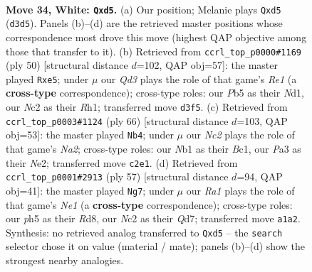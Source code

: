 \documentclass[11pt]{article}
\begin{document}
\clearpage

\begin{figure}[p]\centering
\begin{subfigure}{0.46\textwidth}\centering
\resizebox{\linewidth}{!}{%
\newchessgame
\chessboard[
  setfen={r2q1rk1/3n1pb1/3p4/1Ppb3p/p5nP/P2Q2P1/1PNB4/RN3RK1 w - - 2 34},
  showmover=false,
  pgfstyle=straightmove, color=movearrow, markmove={d3-d5}
]}
\caption{}
\end{subfigure}\hfill
\begin{subfigure}{0.46\textwidth}\centering
\resizebox{\linewidth}{!}{%
\newchessgame
\chessboard[
  setfen={r4r2/1bp2qbk/5np1/p3n2p/1p5P/3B2Q1/PPP2NP1/1K1NR2R w - - 0 26},
  showmover=false,
  pgfstyle=straightmove, color=movearrow, markmove={e1-e5}
]}
\caption{}
\end{subfigure}
\\[4pt]
\begin{subfigure}{0.46\textwidth}\centering
\resizebox{\linewidth}{!}{%
\newchessgame
\chessboard[
  setfen={rq4k1/1rn3b1/3p2p1/1pnPp1Pp/4P3/P4R1P/N1Q1N1K1/1RB5 w - - 9 34},
  showmover=false,
  pgfstyle=straightmove, color=movearrow, markmove={a2-b4}
]}
\caption{}
\end{subfigure}\hfill
\begin{subfigure}{0.46\textwidth}\centering
\resizebox{\linewidth}{!}{%
\newchessgame
\chessboard[
  setfen={3rn1k1/3q1p1p/1pn3r1/pNbp1p2/8/3PP1P1/1B3PBP/R1RQ2K1 b - - 11 29},
  showmover=false,
  pgfstyle=straightmove, color=movearrow, markmove={e8-g7}
]}
\caption{}
\end{subfigure}
\caption{\textbf{Move 34, White: \texttt{Qxd5}.} (a) Our position; Melanie plays \texttt{Qxd5} (\texttt{d3d5}). Panels (b)--(d) are the retrieved master positions whose correspondence most drove this move (highest QAP objective among those that transfer to it). (b) Retrieved from \texttt{ccrl\_top\_p0000\#1169} (ply 50) [structural distance $d$=102, QAP obj=57]: the master played \texttt{Rxe5}; under $\mu$ our \emph{Qd3} plays the role of that game's \emph{Re1} (a \textbf{cross-type} correspondence); cross-type roles: our \emph{P}b5 as their \emph{N}d1, our \emph{N}c2 as their \emph{R}h1; transferred move \texttt{d3f5}. (c) Retrieved from \texttt{ccrl\_top\_p0003\#1124} (ply 66) [structural distance $d$=103, QAP obj=53]: the master played \texttt{Nb4}; under $\mu$ our \emph{Nc2} plays the role of that game's \emph{Na2}; cross-type roles: our \emph{N}b1 as their \emph{B}c1, our \emph{P}a3 as their \emph{N}e2; transferred move \texttt{c2e1}. (d) Retrieved from \texttt{ccrl\_top\_p0001\#2913} (ply 57) [structural distance $d$=94, QAP obj=41]: the master played \texttt{Ng7}; under $\mu$ our \emph{Ra1} plays the role of that game's \emph{Ne1} (a \textbf{cross-type} correspondence); cross-type roles: our \emph{p}h5 as their \emph{R}d8, our \emph{N}c2 as their \emph{Q}d7; transferred move \texttt{a1a2}. Synthesis: no retrieved analog transferred to \texttt{Qxd5} -- the \texttt{search} selector chose it on value (material / mate); panels (b)--(d) show the strongest nearby analogies.}
\label{fig:thought-m66}
\end{figure}
\end{document}
